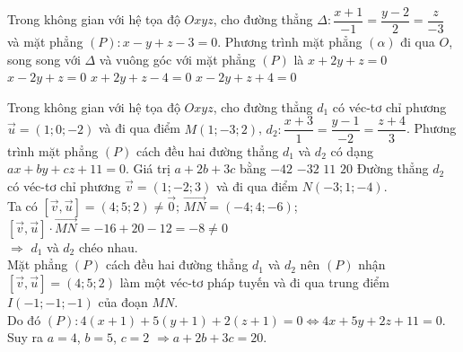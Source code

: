 \begin{ex}%
	Trong không gian với hệ tọa độ $Oxyz$, cho đường thẳng $\Delta\colon \dfrac{x+1}{-1}=\dfrac{y-2}{2}=\dfrac{z}{-3}$ và mặt phẳng $(P)\colon x-y+z-3=0$. Phương trình mặt phẳng $(\alpha)$ đi qua $O$, song song với $\Delta$ và vuông góc với mặt phẳng $(P)$ là
	\choice 
		{\True $x+2 y+z=0$}
		{$x-2 y+z=0$}
		{$x+2 y+z-4=0$}
		{$x-2 y+z+4=0$}
\end{ex}
\begin{ex}%
	Trong không gian với hệ tọa độ $Oxyz$, cho đường thẳng $d_1$ có véc-tơ chỉ phương $\overrightarrow{u}=(1;0;-2)$ và đi qua điểm $M(1;-3;2)$, $d_2\colon\dfrac{x+3}{1}=\dfrac{y-1}{-2}=\dfrac{z+4}{3}$. Phương trình mặt phẳng $(P)$ cách đều hai đường thẳng $d_1$ và $d_2$ có dạng $ax+by+cz+11=0$. Giá trị $ a+2b+3c$ bằng
	\choice
	{$-42$}
	{$-32$}
	{$ 11$}
	{\True $20$}
	\loigiai
	{
		Đường thẳng $d_2$ có véc-tơ chỉ phương $\overrightarrow{v}=(1;-2;3)$ và đi qua điểm $ N(-3;1;-4)$.\\
		Ta có $\left[\overrightarrow{v},\overrightarrow{u}\right]=(4;5;2)\ne\overrightarrow{0}$; $\overrightarrow{MN}=\left(-4;4;-6\right)$; $\left[\overrightarrow{v},\overrightarrow{u}\right]\cdot \overrightarrow{MN}=-16+20-12=-8\ne 0$\\
		$\Rightarrow $ $d_1$ và $d_2$ chéo nhau.\\
		Mặt phẳng $(P)$ cách đều hai đường thẳng $d_1$ và $d_2$ nên $(P)$ nhận $\left[\overrightarrow{v},\overrightarrow{u}\right]=(4;5;2)$ làm một véc-tơ pháp tuyến và đi qua trung điểm $ I(-1;-1;-1)$ của đoạn $ MN$.\\
		Do đó $(P)\colon 4\left(x+1\right)+5\left(y+1\right)+2\left(z+1\right)=0\Leftrightarrow 4x+5y+2z+11=0$.\\
		Suy ra $ a=4$, $b=5$, $c=2$ $\Rightarrow a+2b+3c=20$.}
\end{ex}

